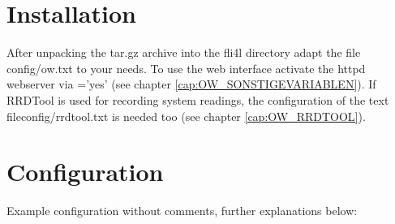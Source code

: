 \section{Installation}
After unpacking the tar.gz archive into the fli4l directory adapt the file
config/ow.txt to your needs. To use the web interface activate the httpd
webserver via ='yes' (see chapter \ref{cap:OW_SONSTIGEVARIABLEN}).
If RRDTool is used for recording system readings, the configuration of the
text fileconfig/rrdtool.txt is needed too (see chapter \ref{cap:OW_RRDTOOL}).

\section{Configuration}
Example configuration without comments, further explanations below:

